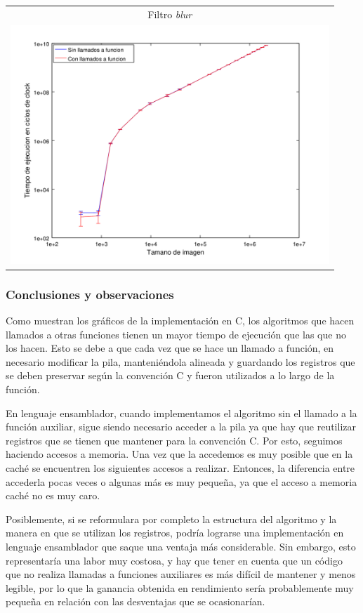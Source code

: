 				{\centering \begin{tabular}{c}
		      		{\small Filtro \emph{blur}} \\
		      		\includegraphics[width=12cm]{../exp/graficos/exp4-blur-asm_vs_asm2.png} \\
		    	\end{tabular}}

			\subsubsection*{Conclusiones y observaciones}		

				Como muestran los gráficos de la implementación en C, los algoritmos que hacen llamados a otras funciones tienen un mayor tiempo de ejecución que las que no los hacen. Esto se debe a que cada vez que se hace un llamado a función, en necesario modificar la pila, manteniéndola alineada y guardando los registros que se deben preservar según la convención C y fueron utilizados a lo largo de la función.

				En lenguaje ensamblador, cuando implementamos el algoritmo sin el llamado a la función auxiliar, sigue siendo necesario acceder a la pila ya que hay que reutilizar registros que se tienen que mantener para la convención C. Por esto, seguimos haciendo accesos a memoria. Una vez que la accedemos es muy posible que en la caché se encuentren los siguientes accesos a realizar. Entonces, la diferencia entre accederla pocas veces o algunas más es muy pequeña, ya que el acceso a memoria caché no es muy caro.

				Posiblemente, si se reformulara por completo la estructura del algoritmo y la manera en que se utilizan los registros, podría lograrse una implementación en lenguaje ensamblador que saque una ventaja más considerable. Sin embargo, esto representaría una labor muy costosa, y hay que tener en cuenta que un código que no realiza llamadas a funciones auxiliares es más difícil de mantener y menos legible, por lo que la ganancia obtenida en rendimiento sería probablemente muy pequeña en relación con las desventajas que se ocasionarían.

